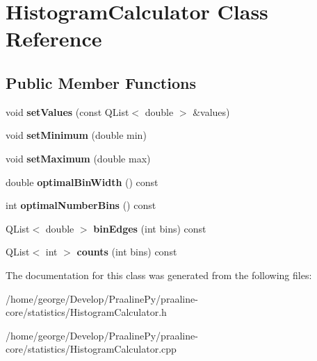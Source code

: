 \hypertarget{class_histogram_calculator}{}\section{Histogram\+Calculator Class Reference}
\label{class_histogram_calculator}
\subsection*{Public Member Functions}
\begin{DoxyCompactItemize}
\item 
\mbox{\label{class_histogram_calculator_afbaca8c20aac86708acb2cc97d4c22bd}} 
void {\bfseries set\+Values} (const Q\+List$<$ double $>$ \&values)
\item 
\mbox{\label{class_histogram_calculator_a8eb9e4db27d7d14b0f621c5870e7ccdc}} 
void {\bfseries set\+Minimum} (double min)
\item 
\mbox{\label{class_histogram_calculator_acf58b8167de843f628ec3756bafbd766}} 
void {\bfseries set\+Maximum} (double max)
\item 
\mbox{\label{class_histogram_calculator_a72bdc4fe645a7197ede79a88eabaf37d}} 
double {\bfseries optimal\+Bin\+Width} () const
\item 
\mbox{\label{class_histogram_calculator_ad9f572826bc52b1bf1fa87a4f8e5c151}} 
int {\bfseries optimal\+Number\+Bins} () const
\item 
\mbox{\label{class_histogram_calculator_a6129b8e0eb63b2c359e0666929d76304}} 
Q\+List$<$ double $>$ {\bfseries bin\+Edges} (int bins) const
\item 
\mbox{\label{class_histogram_calculator_ab28d0a0f98b19262eb18f595a142d854}} 
Q\+List$<$ int $>$ {\bfseries counts} (int bins) const
\end{DoxyCompactItemize}


The documentation for this class was generated from the following files\+:\begin{DoxyCompactItemize}
\item 
/home/george/\+Develop/\+Praaline\+Py/praaline-\/core/statistics/Histogram\+Calculator.\+h\item 
/home/george/\+Develop/\+Praaline\+Py/praaline-\/core/statistics/Histogram\+Calculator.\+cpp\end{DoxyCompactItemize}
